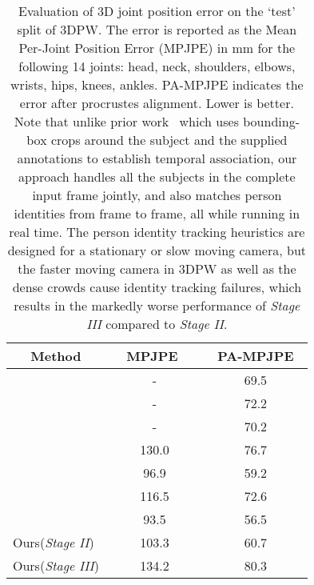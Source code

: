\documentclass[acmtog,authorversion]{acmart}
\newcommand{\change}[1]{{{#1}}}
\begin{document}
\begin{table}[]
\renewcommand{\tabcolsep}{1.5pt}
\centering
\caption{\change{Evaluation of 3D joint position error on the `test' split of 3DPW. The error is reported as the Mean Per-Joint Position Error (MPJPE) in mm for the following 14 joints: head, neck, shoulders, elbows, wrists, hips, knees, ankles. PA-MPJPE indicates the error after procrustes alignment. Lower is better.
Note that unlike prior work~\cite{humanMotionKanazawa19,kanazawa2018endtoend,kocabas2019vibe} which uses bounding-box crops around the subject and the supplied annotations to establish temporal association, our approach handles all the subjects in the complete input frame jointly, and also matches person identities from frame to frame, all while running in real time. The person identity tracking heuristics are designed for a stationary or slow moving camera, but the faster moving camera in 3DPW as well as the dense crowds cause identity tracking failures, which results in the markedly worse performance of \textit{Stage III} compared to \textit{Stage II}. 
}}


\begin{tabular}{l|c|c|}
  \multicolumn{1}{c|}{Method}           & ~~MPJPE ~~ &  ~PA-MPJPE~ \\ \hline
\cite{sun2019human}            &   -    & 69.5     \\
\cite{arnab2019exploiting} &        -      & 72.2     \\
\cite{kolotouros2019convolutional}          &     -         & 70.2     \\
\cite{kanazawa2018endtoend}          & 130.0          & 76.7     \\
\cite{kolotouros2019learning}         & 96.9         & 59.2     \\
\cite{humanMotionKanazawa19}         & 116.5        & 72.6     \\
\cite{kocabas2019vibe}         & 93.5         & 56.5     \\ \hline
Ours(\textit{Stage II})     & 103.3   & 60.7     \\
Ours(\textit{Stage III})    & 134.2   & 80.3     
\end{tabular}
%
 \label{tbl:3dpw}
\end{table}
\end{document}
